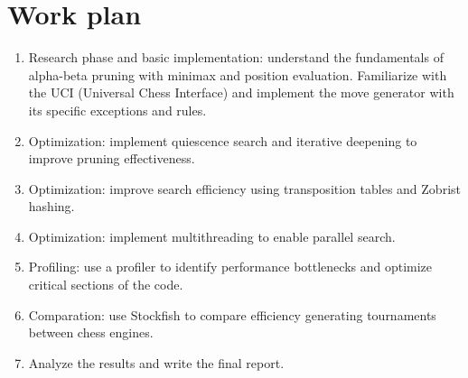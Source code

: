 \section{Work plan}

\begin{enumerate}
    \item Research phase and basic implementation: understand the fundamentals of alpha-beta pruning with minimax and position evaluation. Familiarize with the UCI (Universal Chess Interface) and implement the move generator with its specific exceptions and rules.
    \item Optimization: implement quiescence search and iterative deepening to improve pruning effectiveness.
    \item Optimization: improve search efficiency using transposition tables and Zobrist hashing.
    \item Optimization: implement multithreading to enable parallel search.
    \item Profiling: use a profiler to identify performance bottlenecks and optimize critical sections of the code.
    \item Comparation: use Stockfish to compare efficiency generating tournaments between chess engines.
    \item Analyze the results and write the final report.
\end{enumerate}







